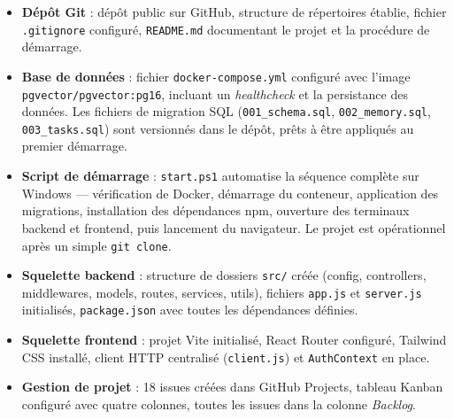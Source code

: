 \documentclass[12pt, a4paper]{article}
\begin{document}
\begin{itemize}
  \item \textbf{Dépôt Git} : dépôt public sur GitHub, structure
        de répertoires établie, fichier \texttt{.gitignore} configuré,
        \texttt{README.md} documentant le projet et la procédure
        de démarrage.

  \item \textbf{Base de données} : fichier \texttt{docker-compose.yml}
        configuré avec l'image \texttt{pgvector/pgvector:pg16},
        incluant un \textit{healthcheck} et la persistance des données.
        Les fichiers de migration SQL (\texttt{001\_schema.sql},
        \texttt{002\_memory.sql}, \texttt{003\_tasks.sql}) sont
        versionnés dans le dépôt, prêts à être appliqués au
        premier démarrage.

  \item \textbf{Script de démarrage} : \texttt{start.ps1} automatise
        la séquence complète sur Windows — vérification de Docker,
        démarrage du conteneur, application des migrations, installation
        des dépendances npm, ouverture des terminaux backend et frontend,
        puis lancement du navigateur. Le projet est opérationnel
        après un simple \texttt{git clone}.

  \item \textbf{Squelette backend} : structure de dossiers
        \texttt{src/} créée (config, controllers, middlewares,
        models, routes, services, utils), fichiers \texttt{app.js}
        et \texttt{server.js} initialisés, \texttt{package.json}
        avec toutes les dépendances définies.

  \item \textbf{Squelette frontend} : projet Vite initialisé,
        React Router configuré, Tailwind CSS installé, client
        HTTP centralisé (\texttt{client.js}) et \texttt{AuthContext}
        en place.

  \item \textbf{Gestion de projet} : 18 issues créées dans GitHub
        Projects, tableau Kanban configuré avec quatre colonnes,
        toutes les issues dans la colonne \textit{Backlog}.
\end{itemize}
\end{document}
